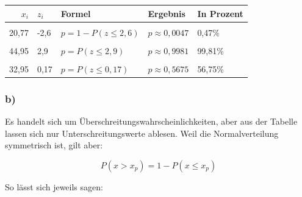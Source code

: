 \documentclass[
  11pt,
  ngerman,
  a4paper,
]{report}
\begin{document}
\begin{table}[H]
\centering
\begin{tabular}{rl>{\raggedright\arraybackslash}p{8cm}ll}
\toprule
\textbf{$x_i$} & \textbf{$z_i$} & \textbf{Formel} & \textbf{Ergebnis} & \textbf{In Prozent}\\
\midrule
\cellcolor{gray!6}{40,63} & \cellcolor{gray!6}{1,92} & \cellcolor{gray!6}{$p=P(z \leq 1{,}92)$} & \cellcolor{gray!6}{$p \approx 0{,}9726$} & \cellcolor{gray!6}{97,26\%}\\
20,77 & -2,6 & $p=1-P(z \leq 2{,}6)$ & $p \approx 0{,}0047$ & 0,47\%\\
\cellcolor{gray!6}{33,41} & \cellcolor{gray!6}{0,27} & \cellcolor{gray!6}{$p=P(z \leq 0{,}27)$} & \cellcolor{gray!6}{$p \approx 0{,}6064$} & \cellcolor{gray!6}{60,64\%}\\
44,95 & 2,9 & $p=P(z \leq 2{,}9)$ & $p \approx 0{,}9981$ & 99,81\%\\
\cellcolor{gray!6}{41,91} & \cellcolor{gray!6}{2,21} & \cellcolor{gray!6}{$p=P(z \leq 2{,}21)$} & \cellcolor{gray!6}{$p \approx 0{,}9864$} & \cellcolor{gray!6}{98,64\%}\\
32,95 & 0,17 & $p=P(z \leq 0{,}17)$ & $p \approx 0{,}5675$ & 56,75\%\\
\bottomrule
\end{tabular}
\end{table}

\hypertarget{b-9}{%
\subsubsection{b)}\label{b-9}}

Es handelt sich um Überschreitungs­wahrscheinlichkeiten, aber aus der Tabelle lassen sich nur Unterschreitungswerte ablesen. Weil die Normalverteilung symmetrisch ist, gilt aber:

\[ P(x>x_p)=1-P(x\leq x_p)\]

So lässt sich jeweils sagen:
\end{document}

